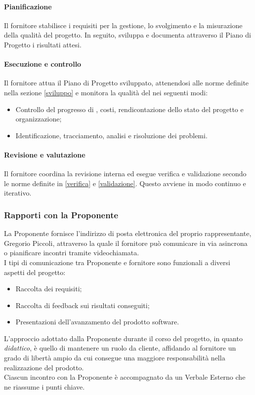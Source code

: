 \paragraph{Pianificazione}
\par Il fornitore stabilisce i requisiti per la gestione, lo svolgimento e la misurazione della qualità del progetto. In seguito, sviluppa e documenta attraverso il Piano di Progetto i risultati attesi.

\paragraph{Esecuzione e controllo}
\par Il fornitore attua il Piano di Progetto sviluppato, attenendosi alle norme definite nella sezione \ref{sviluppo} e monitora la qualità del  nei seguenti modi:
\begin{itemize}
  \item Controllo del progresso di , costi, rendicontazione dello stato del progetto e organizzazione;
  \item Identificazione, tracciamento, analisi e risoluzione dei problemi.
\end{itemize}

\paragraph{Revisione e valutazione}
Il fornitore coordina la revisione interna ed esegue verifica e validazione secondo le norme definite in \ref{verifica} e \ref{validazione}. Questo avviene in modo continuo e iterativo.

\subsubsection{Rapporti con la Proponente} La Proponente \Proponente{} fornisce l'indirizzo di posta elettronica del proprio rappresentante, Gregorio Piccoli, attraverso la quale il fornitore può comunicare in via asincrona o pianificare incontri tramite videochiamata.\\
I tipi di comunicazione tra Proponente e fornitore sono funzionali a diversi aspetti del progetto:
\begin{itemize}
  \item Raccolta dei requisiti;
  \item Raccolta di feedback sui risultati conseguiti;
  \item Presentazioni dell'avanzamento del prodotto software.
\end{itemize}
L'approccio adottato dalla Proponente durante il corso del progetto, in quanto \textit{didattico}, è quello di mantenere un ruolo da cliente, affidando al fornitore un grado di libertà ampio da cui consegue una maggiore responsabilità nella realizzazione del prodotto.\\
Ciascun incontro con la Proponente è accompagnato da un Verbale Esterno che ne riassume i punti chiave.


